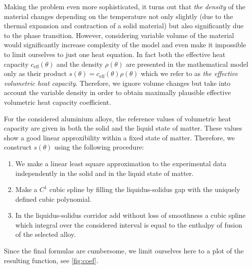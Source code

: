 Making the problem even more sophisticated, it turns out that \emph{the density} of the material changes depending on the temperature not only slightly (due to the thermal expansion and contraction of a solid material) but also significantly due to the phase transition. However, considering variable volume of the material would significantly increase complexity of the model and even make it impossible to limit ourselves to just one heat equation. In fact both the effective heat capacity $c_\text{eff}(\theta)$ and the density $\rho(\theta)$ are presented in the mathematical model only as their product $s(\theta) = c_\text{eff}(\theta) \rho(\theta)$ which we refer to as \emph{the effective volumetric heat capacity}. Therefore, we ignore volume changes but take into account the variable density in order to obtain maximally plausible effective volumetric heat capacity coefficient.

For the considered aluminium alloys, the reference values of volumetric heat capacity are given in both the solid and the liquid state of matter. These values show a good linear approxibility within a fixed state of matter. Therefore, we construct $s(\theta)$ using the following procedure:
\begin{enumerate}
	\item We make a linear least square approximation to the experimental data independently in the solid and in the liquid state of matter.
	\item Make a $C^1$ cubic spline by filling the liquidus-solidus gap with the uniquely defined cubic polynomial.
	\item In the liquidus-solidus corridor add without loss of smoothness a cubic spline which integral over the considered interval is equal to the enthalpy of fusion of the selected alloy.
\end{enumerate}

Since the final formulas are cumbersome, we limit ourselves here to a plot of the resulting function, see \cref{fig:coef}.


